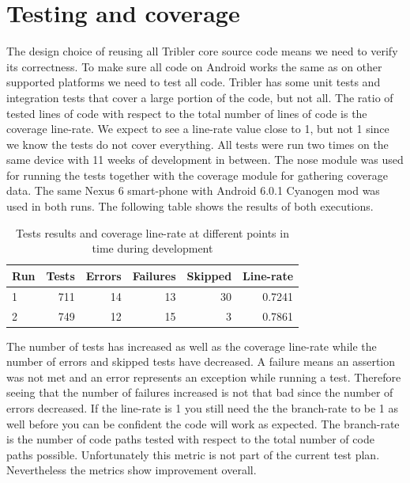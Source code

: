 \section{Testing and coverage}
The design choice of reusing all Tribler core source code means we need to verify its correctness.
To make sure all code on Android works the same as on other supported platforms we need to test all code.
Tribler has some unit tests and integration tests that cover a large portion of the code, but not all.
The ratio of tested lines of code with respect to the total number of lines of code is the coverage line-rate.
We expect to see a line-rate value close to 1, but not 1 since we know the tests do not cover everything.
All tests were run two times on the same device with 11 weeks of development in between.
The nose module was used for running the tests together with the coverage module for gathering coverage data.
The same Nexus 6 smart-phone with Android 6.0.1 Cyanogen mod was used in both runs.
The following table shows the results of both executions.
\begin{table}
	\begin{tabular}{l | *{5}{r}} \hline
		Run & Tests & Errors & Failures & Skipped & Line-rate \\ \hline \hline
		1     & 711   & 14       & 13          & 30          & 0.7241 \\ \hline
		2     & 749   & 12       & 15          & 3            & 0.7861 \\ \hline
	\end{tabular}
	\caption{Tests results and coverage line-rate at different points in time during development}
	\label{table:testing_coverage}
\end{table}
The number of tests has increased as well as the coverage line-rate while the number of errors and skipped tests have decreased.
A failure means an assertion was not met and an error represents an exception while running a test.
Therefore seeing that the number of failures increased is not that bad since the number of errors decreased.
If the line-rate is 1 you still need the the branch-rate to be 1 as well before you can be confident the code will work as expected.
The branch-rate is the number of code paths tested with respect to the total number of code paths possible.
Unfortunately this metric is not part of the current test plan.
Nevertheless the metrics show improvement overall.


